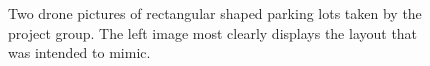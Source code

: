 \begin{figure}[H]
  \centering
  \begin{subfigure}[b]{0.55\textwidth}
  \end{subfigure}
  \quad
  \begin{subfigure}[b]{0.335\textwidth}
  \end{subfigure}
  \caption{Two drone pictures of rectangular shaped parking lots taken by the project group. The left image most clearly displays the layout that was intended to mimic.}
  \label{fig:parkings}
\end{figure}
